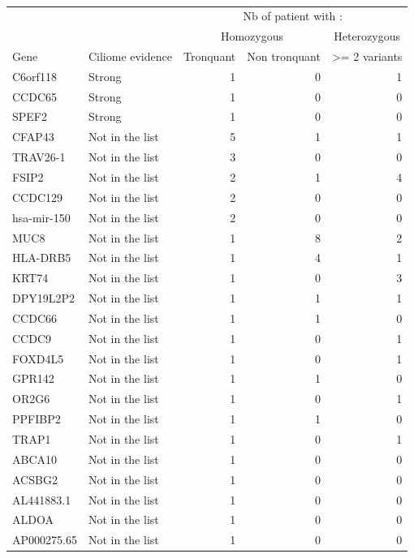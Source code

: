 \documentclass[12pt,twoside]{reedthesis}
\theoremstyle{definition}
\theoremstyle{definition}
\theoremstyle{remark}
\begin{document}
  \begin{longtable}[t]{llrrr}
  \caption{\label{tab:annexetabaftergrp1}}\\
  \toprule
  \multicolumn{1}{c}{ } & \multicolumn{1}{c}{ } & \multicolumn{3}{c}{Nb of patient with : } \\
  \cmidrule(l{2pt}r{2pt}){3-5}
  \multicolumn{1}{c}{ } & \multicolumn{1}{c}{ } & \multicolumn{2}{c}{Homozygous} & \multicolumn{1}{c}{Heterozygous} \\
  \cmidrule(l{2pt}r{2pt}){3-4} \cmidrule(l{2pt}r{2pt}){5-5}
  Gene & Ciliome evidence & Tronquant & Non tronquant & >= 2 variants\\
  \midrule
  C6orf118 & Strong & 1 & 0 & 1\\
  CCDC65 & Strong & 1 & 0 & 0\\
  SPEF2 & Strong & 1 & 0 & 0\\
  CFAP43 & Not in the list & 5 & 1 & 1\\
  TRAV26-1 & Not in the list & 3 & 0 & 0\\
  \addlinespace
  FSIP2 & Not in the list & 2 & 1 & 4\\
  CCDC129 & Not in the list & 2 & 0 & 0\\
  hsa-mir-150 & Not in the list & 2 & 0 & 0\\
  MUC8 & Not in the list & 1 & 8 & 2\\
  HLA-DRB5 & Not in the list & 1 & 4 & 1\\
  \addlinespace
  KRT74 & Not in the list & 1 & 0 & 3\\
  DPY19L2P2 & Not in the list & 1 & 1 & 1\\
  CCDC66 & Not in the list & 1 & 1 & 0\\
  CCDC9 & Not in the list & 1 & 0 & 1\\
  FOXD4L5 & Not in the list & 1 & 0 & 1\\
  \addlinespace
  GPR142 & Not in the list & 1 & 1 & 0\\
  OR2G6 & Not in the list & 1 & 0 & 1\\
  PPFIBP2 & Not in the list & 1 & 1 & 0\\
  TRAP1 & Not in the list & 1 & 0 & 1\\
  ABCA10 & Not in the list & 1 & 0 & 0\\
  \addlinespace
  ACSBG2 & Not in the list & 1 & 0 & 0\\
  AL441883.1 & Not in the list & 1 & 0 & 0\\
  ALDOA & Not in the list & 1 & 0 & 0\\
  AP000275.65 & Not in the list & 1 & 0 & 0\\

\end{longtable}
\end{document}
